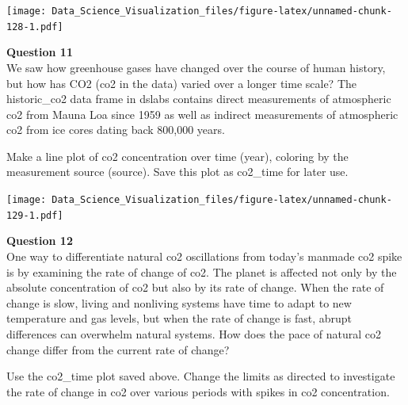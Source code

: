 \documentclass[
]{article}
\newenvironment{Shaded}{\begin{snugshade}}{\end{snugshade}}
\newcommand{\DataTypeTok}[1]{\textcolor[rgb]{0.13,0.29,0.53}{#1}}
\newcommand{\KeywordTok}[1]{\textcolor[rgb]{0.13,0.29,0.53}{\textbf{#1}}}
\newcommand{\NormalTok}[1]{#1}
\newcommand{\OperatorTok}[1]{\textcolor[rgb]{0.81,0.36,0.00}{\textbf{#1}}}
\newcommand{\StringTok}[1]{\textcolor[rgb]{0.31,0.60,0.02}{#1}}
\begin{document}
\begin{Shaded}
\end{Shaded}

\texttt{[image: Data\_Science\_Visualization\_files/figure-latex/unnamed-chunk-128-1.pdf]}

\textbf{Question 11}\\
We saw how greenhouse gases have changed over the course of human
history, but how has CO2 (co2 in the data) varied over a longer time
scale? The historic\_co2 data frame in dslabs contains direct
measurements of atmospheric co2 from Mauna Loa since 1959 as well as
indirect measurements of atmospheric co2 from ice cores dating back
800,000 years.

Make a line plot of co2 concentration over time (year), coloring by the
measurement source (source). Save this plot as co2\_time for later use.

\begin{Shaded}
\end{Shaded}

\texttt{[image: Data\_Science\_Visualization\_files/figure-latex/unnamed-chunk-129-1.pdf]}

\textbf{Question 12}\\
One way to differentiate natural co2 oscillations from today's manmade
co2 spike is by examining the rate of change of co2. The planet is
affected not only by the absolute concentration of co2 but also by its
rate of change. When the rate of change is slow, living and nonliving
systems have time to adapt to new temperature and gas levels, but when
the rate of change is fast, abrupt differences can overwhelm natural
systems. How does the pace of natural co2 change differ from the current
rate of change?

Use the co2\_time plot saved above. Change the limits as directed to
investigate the rate of change in co2 over various periods with spikes
in co2 concentration.
\end{document}
